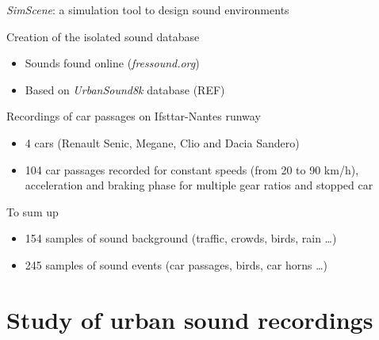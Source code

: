 \documentclass{beamer}
\begin{document}
\begin{frame}{\textit{SimScene}: a simulation tool to design sound environments}

\begin{block}{Creation of the isolated sound database}
\begin{itemize}
	\item Sounds found online (\textit{fressound.org})
	\item Based on \textit{UrbanSound8k} database (REF)
\end{itemize}
\end{block}

\begin{block}{Recordings of car passages on Ifsttar-Nantes runway}
\begin{itemize}
	\item 4 cars (Renault Senic, Megane, Clio and Dacia Sandero)
	\item 104 car passages recorded for constant speeds (from 20 to 90 km/h), acceleration and braking phase for multiple gear ratios and stopped car
\end{itemize}
\end{block}

\begin{block}{To sum up}
\begin{itemize}
\item 154 samples of sound background (traffic, crowds, birds, rain \dots)
\item 245 samples of sound events (car passages, birds, car horns \dots)
\end{itemize}
\end{block}

\end{frame}


\section{Study of urban sound recordings}
\end{document}
